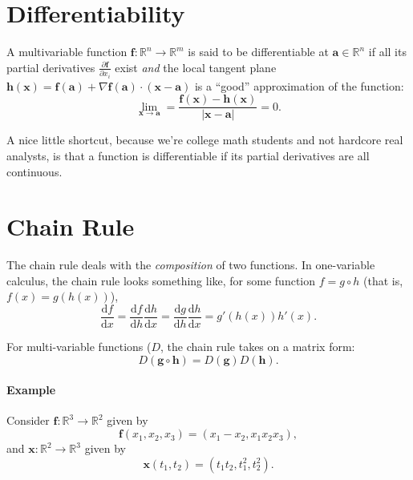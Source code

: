 \documentclass[11pt]{article}
\renewcommand{\vec}[1]{\mathbf{#1}}
\begin{document}


\section*{Differentiability} 

A multivariable function \(\vec f\colon \mathbb R^n \to \mathbb R^m\) is said to be differentiable at \(\vec a \in \mathbb R^n\) if all its partial derivatives \(\frac{\partial \vec f}{\partial x_i}\) exist \emph{and} the local tangent plane \(\vec h(\vec x) = \vec f(\vec a) + \nabla \vec f(\vec a) \cdot (\vec x - \vec a)\) is a ``good'' approximation of the function:
\[
    \lim_{\vec x \to \vec a} = \frac{\vec f(\vec x) - \vec h(\vec x)}{|\vec x - \vec a|} = 0.
\]

A nice little shortcut, because we're college math students and not hardcore real analysts, is that a function is differentiable if its partial derivatives are all continuous.

\section*{Chain Rule}

The chain rule deals with the \emph{composition} of two functions. In one-variable calculus, the chain rule looks something like, for some function \(f = g \circ h\) (that is, \(f(x) = g(h(x))\)),
\[
    \frac{\mathrm df}{\mathrm dx} = \frac{\mathrm df}{\mathrm dh} \frac{\mathrm dh}{\mathrm dx} = \frac{\mathrm dg}{\mathrm dh} \frac{\mathrm dh}{\mathrm dx} = g'(h(x)) h'(x).
\]

For multi-variable functions (\(D\), the chain rule takes on a matrix form:
\[
    D (\vec g \circ \vec h) = D (\vec g) D (\vec h).
\]

\paragraph{Example}

Consider \(\vec f\colon \mathbb R^3 \to \mathbb R^2\) given by 
\[
    \vec f(x_1, x_2, x_3) = (x_1 - x_2, x_1 x_2 x_3),
\]
and \(\vec x\colon \mathbb R^2 \to \mathbb R^3\) given by
\[
    \vec x(t_1, t_2) = (t_1 t_2, t_1^2, t_2^2).
\]
\end{document}
